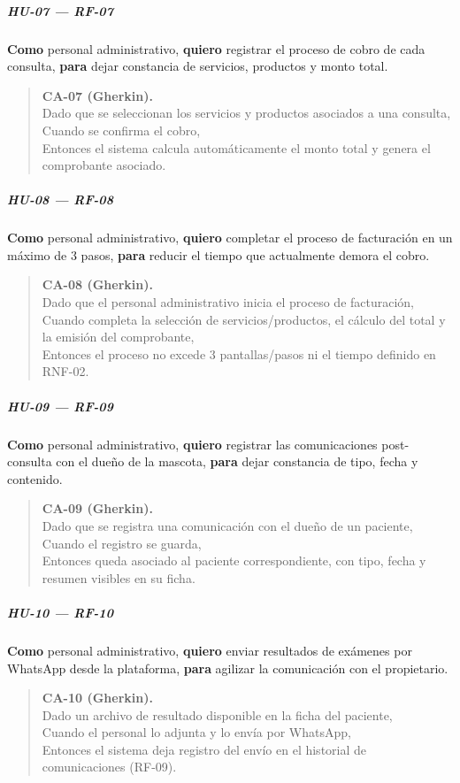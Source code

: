 \documentclass[
]{article}
\begin{document}
\subparagraph{HU-07 --- RF-07}
\textbf{Como} personal administrativo,
\textbf{quiero} registrar el proceso de cobro de cada consulta,
\textbf{para} dejar constancia de servicios, productos y monto total.

\begin{quote}
\textbf{CA-07 (Gherkin).} \\
Dado que se seleccionan los servicios y productos asociados a una consulta, \\
Cuando se confirma el cobro, \\
Entonces el sistema calcula automáticamente el monto total y genera el comprobante asociado.
\end{quote}

\subparagraph{HU-08 --- RF-08}
\textbf{Como} personal administrativo,
\textbf{quiero} completar el proceso de facturación en un máximo de 3 pasos,
\textbf{para} reducir el tiempo que actualmente demora el cobro.

\begin{quote}
\textbf{CA-08 (Gherkin).} \\
Dado que el personal administrativo inicia el proceso de facturación, \\
Cuando completa la selección de servicios/productos, el cálculo del total y la emisión del comprobante, \\
Entonces el proceso no excede 3 pantallas/pasos ni el tiempo definido en RNF-02.
\end{quote}

\subparagraph{HU-09 --- RF-09}
\textbf{Como} personal administrativo,
\textbf{quiero} registrar las comunicaciones post-consulta con el dueño de la mascota,
\textbf{para} dejar constancia de tipo, fecha y contenido.

\begin{quote}
\textbf{CA-09 (Gherkin).} \\
Dado que se registra una comunicación con el dueño de un paciente, \\
Cuando el registro se guarda, \\
Entonces queda asociado al paciente correspondiente, con tipo, fecha y resumen visibles en su ficha.
\end{quote}

\subparagraph{HU-10 --- RF-10}
\textbf{Como} personal administrativo,
\textbf{quiero} enviar resultados de exámenes por WhatsApp desde la plataforma,
\textbf{para} agilizar la comunicación con el propietario.

\begin{quote}
\textbf{CA-10 (Gherkin).} \\
Dado un archivo de resultado disponible en la ficha del paciente, \\
Cuando el personal lo adjunta y lo envía por WhatsApp, \\
Entonces el sistema deja registro del envío en el historial de comunicaciones (RF-09).
\end{quote}
\end{document}
